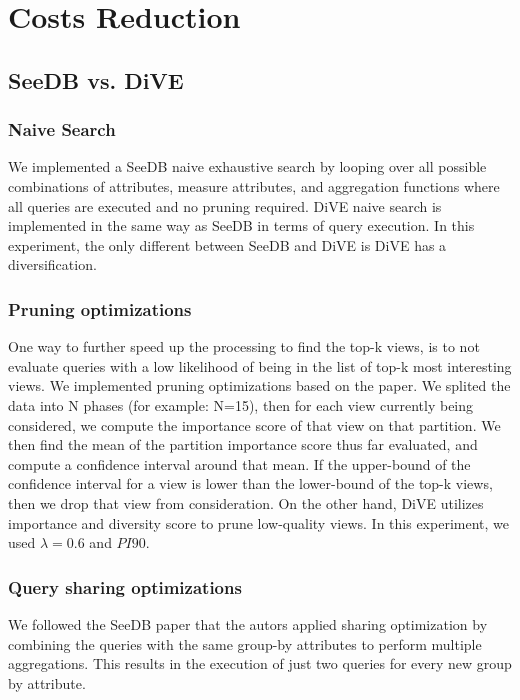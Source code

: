 \documentclass{article}
\begin{document}
\section{Costs Reduction}

\subsection{SeeDB vs. DiVE}
\subsubsection{Naive Search}
We implemented a SeeDB naive exhaustive search by looping over all possible combinations of attributes,  measure attributes, and aggregation functions where all queries are executed and no pruning required. DiVE naive search is implemented in the same way as SeeDB in terms of query execution. In this experiment, the only different between SeeDB and DiVE is DiVE has a diversification.






\subsubsection{Pruning optimizations}
One way to further speed up the processing to find the top-k views, is to not evaluate queries with a low likelihood of being in the list of top-k most interesting views. We implemented pruning optimizations based on the paper. We splited the data into N phases (for example: N=15), then for each view currently being considered, we compute the importance score of that view on that partition. We then find the mean of the partition importance score thus far evaluated, and compute a confidence interval around that mean. If the upper-bound of the confidence interval for a view is lower than the lower-bound of the top-k views, then we drop that view from consideration. On the other hand, DiVE utilizes importance and diversity score to prune low-quality views. In this experiment, we used $\lambda = 0.6$ and $PI 90$.


\subsubsection{Query sharing optimizations}
We followed the SeeDB paper that the autors applied sharing optimization by combining the queries with the same group-by attributes to perform multiple aggregations. This results in the execution of just two queries for every new group by attribute.
\end{document}
